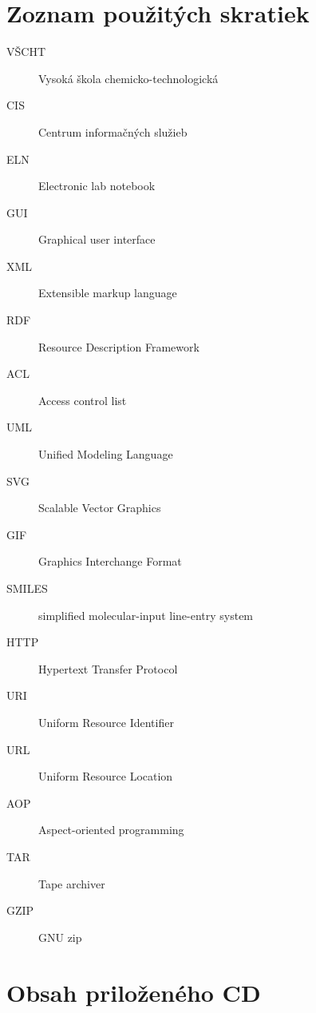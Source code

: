 \documentclass[thesis=M,slovak]{FITthesis}[2013/05/06]
\begin{document}
\chapter{Zoznam použitých skratiek}
\begin{description}
	\item[VŠCHT] Vysoká škola chemicko-technologická
	\item[CIS] Centrum informačných služieb
	\item[ELN] Electronic lab notebook
	\item[GUI] Graphical user interface
	\item[XML] Extensible markup language
	\item[RDF] Resource Description Framework
	\item[ACL] Access control list
	\item[UML] Unified Modeling Language
	\item[SVG] Scalable Vector Graphics
	\item[GIF] Graphics Interchange Format
	\item[SMILES] simplified molecular-input line-entry system
	\item[HTTP] Hypertext Transfer Protocol
	\item[URI] Uniform Resource Identifier
	\item[URL] Uniform Resource Location
	\item[AOP] Aspect-oriented programming
	\item[TAR] Tape archiver
	\item[GZIP] GNU zip
\end{description}




\chapter{Obsah priloženého CD}


\begin{figure}
\end{figure}
\end{document}
